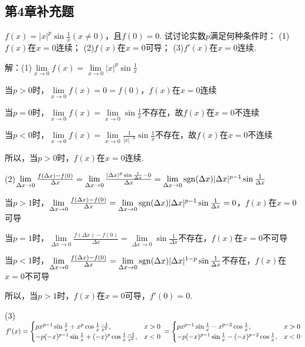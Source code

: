 \documentclass[12pt,UTF8]{ctexart}
\begin{document}
\subsection{第4章补充题}
\begin{enumerate}
$f(x)=|x|^p\sin\frac1x(x\neq0)$，且$f(0)=0$. 试讨论实数$p$满足何种条件时：
\newline
(1)$f(x)$在$x=0$连续；
\newline
(2)$f(x)$在$x=0$可导；
\newline
(3)$f'(x)$在$x=0$连续.

解：(1)$\lim\limits_{x\rightarrow0}f(x)=\lim\limits_{x\rightarrow0}|x|^p\sin\frac1x$

当$p>0$时，$\lim\limits_{x\rightarrow0}f(x)=0=f(0)$，$f(x)$在$x=0$连续

当$p=0$时，$\lim\limits_{x\rightarrow0}f(x)=\lim\limits_{x\rightarrow0}\sin\frac1x$不存在，故$f(x)$在$x=0$不连续

当$p<0$时，$\lim\limits_{x\rightarrow0}f(x)=\lim\limits_{x\rightarrow0}\frac1{|x|^{-p}}\sin\frac1x$不存在，故$f(x)$在$x=0$不连续

所以，当$p>0$时，$f(x)$在$x=0$连续.

(2)$\lim\limits_{\Delta x\rightarrow0}\frac{f(\Delta x)-f(0)}{\Delta x}=\lim\limits_{\Delta x\rightarrow0}\frac{|\Delta x|^p\sin\frac1{\Delta x}-0}{\Delta x}=\lim\limits_{\Delta x\rightarrow0}{\rm sgn}(\Delta x)|\Delta x|^{p-1}\sin\frac1{\Delta x}$

当$p>1$时，$\lim\limits_{\Delta x\rightarrow0}\frac{f(\Delta x)-f(0)}{\Delta x}=\lim\limits_{\Delta x\rightarrow0}{\rm sgn}(\Delta x)|\Delta x|^{p-1}\sin\frac1{\Delta x}=0$，$f(x)$在$x=0$可导

当$p=1$时，$\lim\limits_{\Delta x\rightarrow0}\frac{f(\Delta x)-f(0)}{\Delta x}=\lim\limits_{\Delta x\rightarrow0}\sin\frac1{\Delta x}$不存在，$f(x)$在$x=0$不可导

当$p<1$时，$\lim\limits_{\Delta x\rightarrow0}\frac{f(\Delta x)-f(0)}{\Delta x}=\lim\limits_{\Delta x\rightarrow0}{\rm sgn}(\Delta x)|\Delta x|^{1-p}\sin\frac1{\Delta x}$不存在，$f(x)$在$x=0$不可导

所以，当$p>1$时，$f(x)$在$x=0$可导，$f'(0)=0$.

(3)$f'(x)=\begin{cases}
px^{p-1}\sin\frac1x+x^p\cos\frac1x\frac{-1}{x^2},&x>0\\
-p(-x)^{p-1}\sin\frac1x+(-x)^p\cos\frac1x\frac{-1}{x^2},&x<0
\end{cases}
\\=\begin{cases}
px^{p-1}\sin\frac1x-x^{p-2}\cos\frac1x,&x>0\\
-p(-x)^{p-1}\sin\frac1x-(-x)^{p-2}\cos\frac1x,&x<0
\end{cases}$


\end{enumerate}
\end{document}
